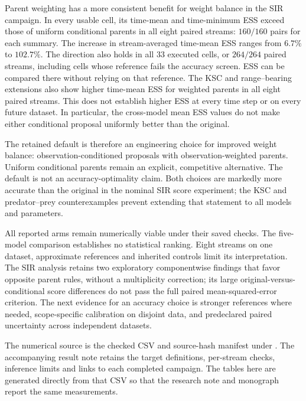 Parent weighting has a more consistent benefit for weight balance in the SIR
campaign. In every usable cell, its time-mean and time-minimum ESS exceed
those of uniform conditional parents in all eight paired streams: $160/160$
pairs for each summary. The increase in stream-averaged time-mean ESS ranges
from $6.7\%$ to $102.7\%$. The direction also holds in all $33$ executed
cells, or $264/264$ paired streams, including cells whose reference fails the
accuracy screen. ESS can be compared there without relying on that reference.
The KSC and range--bearing extensions also show higher time-mean ESS for
weighted parents in all eight paired streams. This does not establish higher
ESS at every time step or on every future dataset. In particular, the
cross-model mean ESS values do not make either conditional proposal uniformly
better than the original.

The retained default is therefore an engineering choice for improved weight
balance: observation-conditioned proposals with observation-weighted parents.
Uniform conditional parents remain an explicit, competitive alternative.
The default is not an accuracy-optimality claim. Both choices are markedly
more accurate than the original in the nominal SIR score experiment; the
KSC and predator--prey counterexamples prevent extending that statement to
all models and parameters.

All reported arms remain numerically viable under their saved checks.
The five-model comparison establishes no statistical ranking. Eight streams
on one dataset, approximate references and inherited controls limit its
interpretation. The SIR analysis retains two exploratory componentwise
findings that favor opposite parent rules, without a multiplicity correction;
its large original-versus-conditional score differences do not pass the full
paired mean-squared-error criterion. The next evidence for an accuracy choice
is stronger references where needed, scope-specific calibration on disjoint
data, and predeclared paired uncertainty across independent datasets.

The numerical source is the checked CSV and source-hash manifest under
.
The accompanying result note retains the target definitions, per-stream
checks, inference limits and links to each completed campaign. The tables
here are generated directly from that CSV so that the research note and
monograph report the same measurements.
